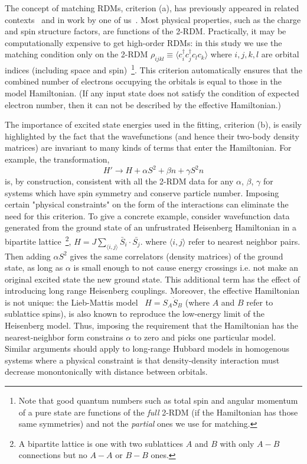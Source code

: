 \documentclass[aip,jcp,twocolumn,10pt]{revtex4-1}
\begin{document}
The concept of matching RDMs, criterion (a), 
has previously appeared in related contexts~\cite{Acioli,Zhou_Ceperley, Changlani_percolation} 
and in work by one of us~\cite{Wagner_JCP}. Most physical properties, 
such as the charge and spin structure factors, are functions of the 2-RDM.
Practically, it may be computationally expensive to get 
high-order RDMs: in this study we use the matching condition only on the 
2-RDM $\rho_{ijkl} \equiv \langle c_i^{\dagger} c_j^{\dagger} c_l c_k \rangle$ where $i,j,k,l$ are orbital indices 
(including space and spin)~\footnote{Note that good quantum numbers such as 
total spin and angular momentum of a pure state are functions of the \emph{full} 
2-RDM (if the Hamiltonian has those same symmetries) and not the \emph{partial} ones we use for matching.}.
This criterion automatically ensures that 
the combined number of electrons occupying the orbitals 
is equal to those in the model Hamiltonian. (If any 
input state does not satisfy the condition of 
expected electron number, then it can not be described by the effective Hamiltonian.)  

The importance of excited state energies 
used in the fitting, criterion (b), is easily highlighted by the fact that 
the wavefunctions (and hence their two-body density matrices) 
are invariant to many kinds of terms that enter the Hamiltonian.
For example, the transformation, 
\begin{equation}
	H' \rightarrow H + \alpha S^2 + \beta n + \gamma S^2 n 
\end{equation}
is, by construction, consistent with all the 2-RDM data 
for any $\alpha$, $\beta$, $\gamma$ 
for systems which have spin symmetry and conserve particle number.
Imposing certain "physical constraints" on the form of the 
interactions can eliminate the need for this criterion. 
To give a concrete example, consider wavefunction data 
generated from the ground state of an unfrustrated 
Heisenberg Hamiltonian in a bipartite lattice~\footnote{A bipartite 
lattice is one with two sublattices $A$ and $B$ with 
only $A-B$ connections but no $A-A$ or $B-B$ ones.}, 
$ H = J \sum_{\langle i,j \rangle}\bar{S}_i \cdot \bar{S_j}.$ 
where $\langle i,j \rangle$ refer to nearest neighbor pairs.
Then adding $\alpha S^2$ gives the same correlators (density matrices) 
of the ground state, as long as $\alpha$ is small enough to not cause 
energy crossings i.e. not make an original 
excited state the new ground state. This additional 
term has the effect of introducing long range Heisenberg couplings. 
Moreover, the effective Hamiltonian is not unique: 
the Lieb-Mattis model~\cite{LM} $H = S_A \dot S_B$ 
(where $A$ and $B$ refer to sublattice spins), is also 
known to reproduce the low-energy limit of the Heisenberg model. 
Thus, imposing the requirement that the Hamiltonian has the 
nearest-neighbor form constrains $\alpha$ to zero and picks 
one particular model. Similar arguments should 
apply to long-range Hubbard models in homogenous 
systems where a physical constraint is that density-density 
interaction must decrease monontonically with distance between orbitals. 
\end{document}
